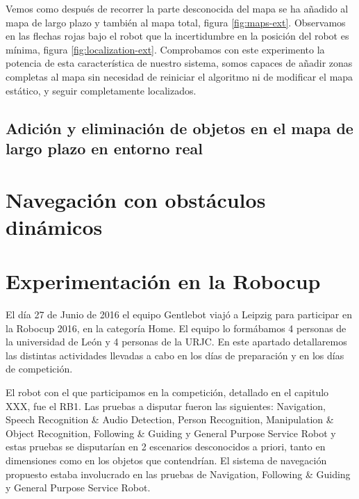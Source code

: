   Vemos como después de recorrer la parte desconocida del mapa se ha añadido al mapa de largo plazo y también al mapa total, figura \ref{fig:maps-ext}. Observamos en las flechas rojas bajo el robot que la incertidumbre en la posición del robot es mínima, figura \ref{fig:localization-ext}. Comprobamos con este experimento la potencia de esta característica de nuestro sistema, somos capaces de añadir zonas completas al mapa sin necesidad de reiniciar el algoritmo ni de modificar el mapa estático, y seguir completamente localizados.

\subsection {Adición y eliminación de objetos en el mapa de largo plazo en entorno real}
\label{sec:add-deleteobjectslongreal}

\section {Navegación con obstáculos dinámicos}
\label{cap:navegacionconobstaculos}

\section {Experimentación en la Robocup}
\label{cap:experimentacionrobocup}

El día 27 de Junio de 2016 el equipo Gentlebot viajó a Leipzig para participar en la Robocup 2016, en la categoría Home. El equipo lo formábamos 4 personas de la universidad de León y 4 personas de la URJC. En este apartado detallaremos las distintas actividades llevadas a cabo en los días de preparación y en los días de competición. 

El robot con el que participamos en la competición, detallado en el capitulo XXX, fue el RB1. Las pruebas a disputar fueron las siguientes: Navigation, Speech Recognition \& Audio Detection, Person Recognition, Manipulation \& Object Recognition, Following \& Guiding y General Purpose Service Robot y estas pruebas se disputarían en 2 escenarios desconocidos a priori, tanto en dimensiones como en los objetos que contendrían. El sistema de navegación propuesto estaba involucrado en las pruebas de Navigation, Following \& Guiding y General Purpose Service Robot. 

